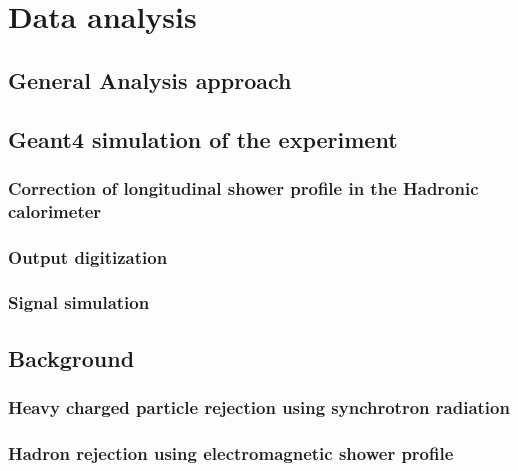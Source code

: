 
\chapter{Data analysis} %
\label{chapter3} %


\section{General Analysis approach}
\label{chapter3:sec:analysis-approach}

\section{Geant4 simulation of the experiment}
\label{chapter3:sec:geant4}

\subsection{Correction of longitudinal shower profile in the Hadronic calorimeter}
\label{chapter3:sec:geant4-hcal-corr}

\subsection{Output digitization}
\label{chapter3:sec:geant4-digitization}

\subsection{Signal simulation}
\label{chapter3:sec:geant4-signal}

\section{Background}
\label{chapter3:sec:bkg}

\subsection{Heavy charged particle rejection using synchrotron radiation}
\label{chapter3:sec:bkg-srd}

\subsection{Hadron rejection using electromagnetic shower profile}
\label{chapter3:sec:bkg-ecal-profile}

